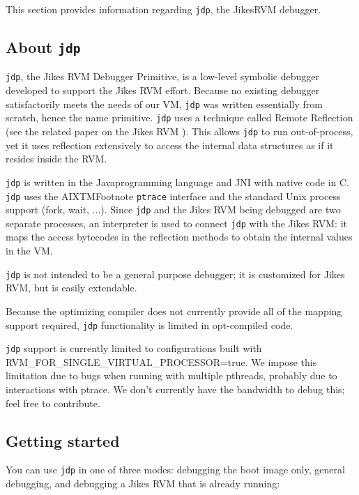 This section provides information regarding {\tt jdp}, the
Jikes\trademark RVM
debugger.

\subsection{About {\tt jdp}}

{\tt jdp}, the Jikes RVM Debugger Primitive, is a low-level symbolic debugger 
developed to support the Jikes
RVM effort.  Because no existing debugger satisfactorily meets the
needs of our VM, {\tt jdp} was written essentially from scratch, hence the
name primitive.  {\tt jdp} uses a technique called Remote
Reflection (see the related paper on the Jikes RVM 
).  This
allows {\tt jdp} to run out-of-process, yet it uses reflection extensively to
access the internal data structures as if it resides inside the RVM.

{\tt jdp} is written in the Java\JavaTMFootnote programming language
and JNI with native code in C.  {\tt jdp} 
uses the
AIXTMFootnote {\tt ptrace} interface and the standard Unix process
support (fork, wait, ...).  
Since {\tt jdp} and
the Jikes RVM being debugged are two separate processes, an interpreter is
used to connect {\tt jdp} with the Jikes RVM:  it maps the access
bytecodes in the 
reflection methods to obtain the internal values in the VM.
  
{\tt jdp} is not intended to be a general purpose debugger; it is 
customized for Jikes RVM, but is easily extendable.  

Because the optimizing compiler does not currently provide all of
the mapping support required, {\tt jdp} functionality is limited in
opt-compiled code. 

{\tt jdp} support is currently limited to configurations built with
RVM\_FOR\_SINGLE\_VIRTUAL\_PROCESSOR=true.  We impose this limitation due
to bugs when running with multiple pthreads, probably due to interactions
with ptrace.  We don't currently have the bandwidth to debug this; feel
free to contribute.

\JavaTMFooter

\AIXTMFooter

\subsection{Getting started}

  You can use {\tt jdp} in one of three modes: debugging the boot image only, 
general debugging, and debugging a Jikes RVM that is already running:

